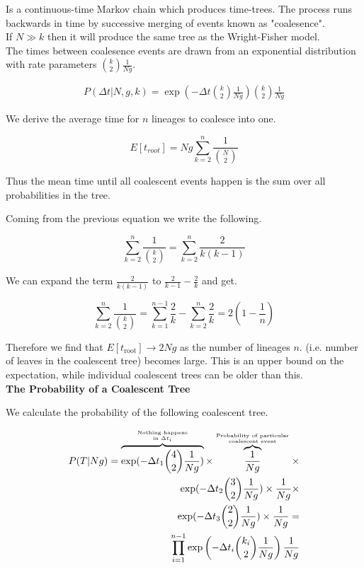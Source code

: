 \documentclass{article}
\begin{document}
\begin{multicols*}{3}
Is a continuous-time Markov chain which produces time-trees. The process runs backwards in time by successive merging of events known as "coalesence".\\

If $N\gg k$ then it will produce the same tree as the Wright-Fisher model.\\

The times between coalesence events are drawn from an exponential distribution with rate parameters ${k\choose 2}\frac{1}{Ng}$. 

\begin{align*}
    P(\Delta t|N,g,k) = \exp{\left(-\Delta t {k\choose 2}\frac{1}{Ng}\right)}{k\choose 2}\frac{1}{Ng}
\end{align*}

We derive the average time for $n$ lineages to coalesce into one.

$$E[t_{root}] = Ng\sum^n_{k = 2}\frac{1}{{N \choose 2}}$$

Thus the mean time until all coalescent events happen is the sum over all probabilities in the tree. 

Coming from the previous equation we write the following. 

$$\sum ^n_{k =2} \frac{1}{{k \choose 2}} = \sum _{k = 2}^n\frac{2}{k(k-1)}$$

We can expand the term $\frac{2}{k(k-1)}$ to $\frac{2}{k-1}-\frac{2}{k}$ and get.

$$\sum _{k = 2}^n\frac{1}{{k \choose 2}} = \sum_{k = 1}^{n-1}\frac{2}{k}- \sum_{k = 2}^{n}\frac{2}{k} = 2(1-\frac{1}{n})$$

Therefore we find that $E[t_{\text{root}}] \rightarrow 2Ng$ as the number of lineages $n$. (i.e. number of leaves in the coalescent tree) becomes large. This is an upper bound on the expectation, while individual coalescent trees can be older than this.\\

\textbf{The Probability of a Coalescent Tree}

We calculate the probability of the following coalescent tree.

\begin{align*}
    P(T|Ng) = \overbrace{\exp(-\Delta t_1{4 \choose 2}\frac{1}{Ng})}^{\text{Nothing happens}\atop\text{in }\Delta t_i}\times \overbrace{\frac{1}{Ng}}^{\text{Probability of particular}\atop \text{coalescent event}}\times\\ \exp(-\Delta t_2{3 \choose 2}\frac{1}{Ng})\times \frac{1}{Ng} \times\\ \exp(-\Delta t_3{2 \choose 2}\frac{1}{Ng})\times \frac{1}{Ng} = \\
    \prod_{i = 1}^{n-1}\exp\left(-\Delta t_i  {k_i \choose 2}\frac{1}{Ng}\right)\frac{1}{Ng}
\end{align*}


\end{multicols*}
\end{document}
